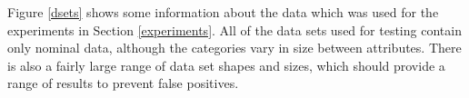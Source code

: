 
Figure \ref{dsets} shows some information about the data which was used for the experiments in Section \ref{experiments}. All of the data sets used for testing contain only nominal data, although the categories vary in size between attributes. There is also a fairly large range of data set shapes and sizes, which should provide a range of results to prevent false positives.



